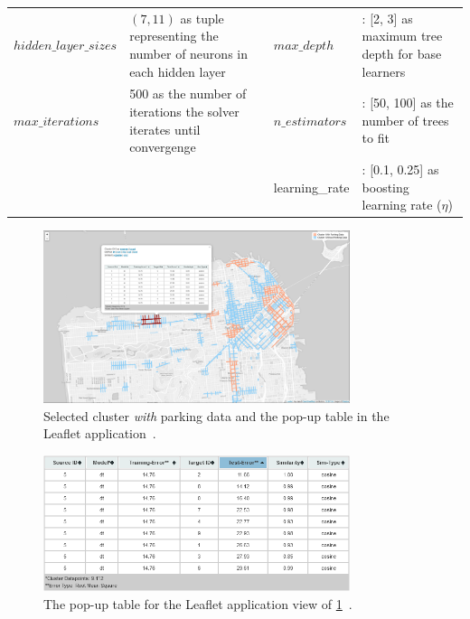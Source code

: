 \begin{table}
{\begin{tabular}{lp{4cm}lp{4cm}}
				$hidden\_layer\_sizes$ & $(7, 11)$ as tuple representing the number of neurons in each hidden layer & $max\_depth$ & : [2, 3] as maximum tree depth for base learners \\
				
				$max\_iterations$ & 500 as the number of iterations the solver iterates until convergenge & $n\_estimators$ & : [50, 100] as the number of trees to fit\\
				
				& & learning\_rate & : [0.1, 0.25] as boosting learning rate ($\eta$)
				
				\botrule
		\end{tabular}}
		\label{tab:ml_params}
	\end{table}
	
	\begin{figure}[!ht]
		\centering
		\includegraphics[width=0.8\textwidth]{graphics/cwith_source_dt_cosine.png}
		\caption{Selected cluster \textit{with} parking data and the pop-up table in the Leaflet application~\protect\cite{web_application}.}
		\label{fig:cwith}
	\end{figure}
	
	\begin{figure}[!ht]
		\centering
		\includegraphics[width=0.8\textwidth]{graphics/cwith_source_dt_cosine_table.png}
		\caption{The pop-up table for the Leaflet application view of \cref{fig:cwith}~\protect\cite{web_application}.}
		\label{fig:cwith_table}
	\end{figure}
	
